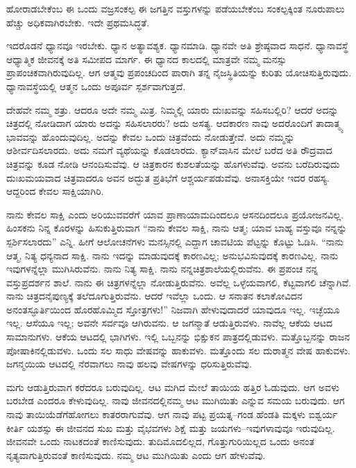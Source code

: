 \vskip 0.1cm

ಹೋರಾಡಬೇಕೆಂಬ ಈ ಒಂದು ವಜ್ರಸಂಕಲ್ಪ ಈ ಜಗತ್ತಿನ ವಸ್ತುಗಳನ್ನು ಪಡೆಯಬೇಕೆಂಬ ಸಂಕಲ್ಪಕ್ಕಿಂತ ನೂರುಪಾಲು ಹೆಚ್ಚು ಅಧಿಕವಾಗಿರಬೇಕು. ಇದೇ ಪ್ರಥಮ\break ಸಿದ್ಧತೆ.

\vskip 0.1cm

ಇದರೊಡನೆ ಧ್ಯಾನವೂ ಇರಬೇಕು. ಧ್ಯಾನ ಅತ್ಯಾವಶ್ಯಕ. ಧ್ಯಾನಮಾಡಿ. ಧ್ಯಾನವೇ ಅತಿ ಶ್ರೇಷ್ಠವಾದ ಸಾಧನೆ. ಧ್ಯಾನಾವಸ್ಥೆ ಆಧ್ಯಾತ್ಮಿಕ ಜೀವನಕ್ಕೆ ಅತಿ ಸಮೀಪದ ಮಾರ್ಗ. ಈ ಧ್ಯಾನದ ಕಾಲದಲ್ಲಿ ಮಾತ್ರವೇ ನಮ್ಮ ಮನಸ್ಸು ಪ್ರಾಪಂಚಿಕವಾಗಿರುವುದಿಲ್ಲ. ಆಗ ಆತ್ಮವು ಪ್ರಪಂಚದಿಂದ ಪಾರಾಗಿ ತನ್ನ ನೈಜಸ್ಥಿತಿಯನ್ನು ಕುರಿತು ಯೋಚಿಸುತ್ತಿರುವುದು. ಧ್ಯಾನಾವಸ್ಥೆಯಲ್ಲಿ ಆತ್ಮನ ಒಂದು ಅಪೂರ್ವ ಸ್ಪರ್ಶವಾಗುತ್ತದೆ.

\eject

ದೇಹವೇ ನಮ್ಮ ಶತ್ರು. ಆದರೂ ಅದೇ ನಮ್ಮ ಮಿತ್ರ. ನಿಮ್ಮಲ್ಲಿ ಯಾರು ದುಃಖವನ್ನು ಸಹಿಸಬಲ್ಲಿರಿ? ಆದರೆ ಅದನ್ನು ಚಿತ್ರದಲ್ಲಿ ನೋಡಿದಾಗ ಯಾರು ಅದನ್ನು ಸಹಿಸಲಾರರು? ಅದು ಅಸತ್ಯ. ಆದಕಾರಣ ನಾವು ಅದರೊಂದಿಗೆ ತಾದಾತ್ಮ್ಯ ಭಾವವನ್ನು ಹೊಂದುವುದಿಲ್ಲ. ಅದನ್ನು ಕೇವಲ ಒಂದು ಚಿತ್ರವೆಂದು ನೋಡುತ್ತೇವೆ. ಅದು ನಮ್ಮನ್ನು ಆಶೀರ್ವದಿಸಲಾರದು. ಅದು ನಮಗೆ ವ್ಯಥೆಯನ್ನು ಕೊಡಲಾರದು. ಕ್ಯಾನ್​ವಾಸಿನ ಮೇಲೆ ಬರೆದ ಅತಿ ರೌದ್ರವಾದ ಚಿತ್ರವನ್ನು ಕೂಡ ನೋಡಿ ಆನಂದಿಸುವೆವು. ಆ ಚಿತ್ರಕಾರನ ಕುಶಲತೆಯನ್ನು ಹೊಗಳುವೆವು. ಅವನು ಬರೆದಿರುವುದು ದುಃಖಮಯವಾದ ಚಿತ್ರವಾದರೂ ಅವನ ಅದ್ಭುತ ಪ್ರತಿಭೆಗೆ ಆಶ್ಚರ್ಯಪಡುವೆವು. ಅನಾಸಕ್ತಿಯೇ ಇದರ ರಹಸ್ಯ. ಆದ್ದರಿಂದ ಕೇವಲ ಸಾಕ್ಷಿಯಾಗಿರಿ.

\vskip 0.1cm

ನಾನು ಕೇವಲ ಸಾಕ್ಷಿ ಎಂದು ಅರಿಯುವವರೆಗೆ ಯಾವ ಪ್ರಾಣಾಯಾಮದಿಂದಲೂ ಆಸನದಿಂದಲೂ ಪ್ರಯೋಜನವಿಲ್ಲ. ಹಿಂಸಕನು ನಿನ್ನ ಕೊರಳನ್ನು ಹಿಸುಕುತ್ತಿರುವಾಗ “ನಾನು ಕೇವಲ ಸಾಕ್ಷಿ, ನಾನು ಆತ್ಮ; ಯಾವ ಬಾಹ್ಯ ವಸ್ತುವೂ ನನ್ನನ್ನು ಸ್ಪರ್ಶಿಸಲಾರದು” ಎನ್ನಿ. ಹೀಗೆ ಆಲೋಚನೆಗಳು ಮನಸ್ಸಿನಲ್ಲಿ ಎದ್ದಾಗ ಚಾವಟಿಯ ಪೆಟ್ಟನ್ನು ಕೊಟ್ಟು ಓಡಿಸಿ. “ನಾನು ಆತ್ಮ, ನಿತ್ಯ ಧನ್ಯನಾದ ಸಾಕ್ಷಿ. ನಾನು ಇದನ್ನು ಮಾಡುವುದಕ್ಕೆ ಕಾರಣವಿಲ್ಲ; ಅನುಭವಿಸುವು\break ದಕ್ಕೆ ಕಾರಣವಿಲ್ಲ. ನಾನು ಇವುಗಳನ್ನೆಲ್ಲಾ ಮುಗಿಸಿರುವೆನು. ನಾನು ನಿತ್ಯ ಸಾಕ್ಷಿ. ನಾನು ನನ್ನ\break ಚಿತ್ರಶಾಲೆಯಲ್ಲಿರುವೆನು. ಈ ಪ್ರಪಂಚ ನನ್ನ ವಸ್ತುಪ್ರದರ್ಶನ ಶಾಲೆ. ನಾನು ಈ ಚಿತ್ರಗಳ\break ನ್ನೆಲ್ಲಾ ನೋಡುತ್ತಿರುವೆನು. ಅವೆಲ್ಲ ಒಳ್ಳೆಯವಾಗಲಿ, ಕೆಟ್ಟವಾಗಲಿ ಚೆನ್ನಾಗಿವೆ. ನಾನು ಚಿತ್ರದ\break ನೈಪುಣ್ಯಕ್ಕೆ ತಲೆದೂಗುತ್ತಿರುವೆನು. ಆದರೆ ಇವೆಲ್ಲಾ ಒಂದು. ಆ ಸನಾತನ ಕಲಾಕೋವಿದನ ಅನಂತಸ್ಫೂರ್ತಿಯಿಂದ ಹೊರಹೊಮ್ಮಿದ ಸ್ತೋತ್ರಗಳು!” ನಿಜವಾಗಿ ಹೇಳುವುದಾದರೆ ಯಾವುದೂ ಇಲ್ಲ. ಇಚ್ಛೆಯೂ ಇಲ್ಲ. ಆಸೆಯೂ ಇಲ್ಲ; ಅವನೇ ಸರ್ವವೂ ಆಗಿರುವನು. ಆ ಜಗನ್ಮಾತೆ ಆಡುತ್ತಿರುವಳು. ನಾವೆಲ್ಲ ಆಕೆಯ ಆಟದ ಸಾಮಾನುಗಳು. ಆಕೆಯ ಆಟದಲ್ಲಿ ಭಾಗಿಗಳು. ಇಲ್ಲಿ ಒಬ್ಬನನ್ನು ಭಿಕ್ಷುಕನ ಪಾತ್ರದಲ್ಲಿಡುವಳು. ಮತ್ತೊಬ್ಬನನ್ನು ರಾಜನ ಪೋಷಾಕಿನಲ್ಲಿಡುವಳು. ಒಂದು ಸಲ ಸಾಧು ವೇಷವನ್ನು ಹಾಕುವಳು. ಮತ್ತೊಂದು ಸಲ ದುರಾತ್ಮನ ವೇಷ ಹಾಕುವಳು. ಜಗನ್ಮಯಿಯ ಆಟದಲ್ಲಿ ನೆರವಾಗಲು ನಾವು ಹಲವು ವೇಷಗಳನ್ನು ಧರಿಸುತ್ತಿರುವೆವು.

\vskip 0.1cm

ಮಗು ಆಡುತ್ತಿರುವಾಗ ಕರೆದರೂ ಬರುವುದಿಲ್ಲ. ಆಟ ಮಗಿದ ಮೇಲೆ ತಾಯಿಯ ಹತ್ತಿರ ಓಡುವುದು. ಆಗ ಅವಳು ಬರಬೇಡ ಎಂದರೂ ಕೇಳುವುದಿಲ್ಲ. ನಾವು ಜೀವನದಲ್ಲಿ\break ನಮ್ಮ ಆಟ ಮುಗಿಯಿತು ಎನ್ನುವ ಸಮಯ ಬರುವುದು. ಆಗ ನಾವು ತಾಯಿಯೆಡೆಗೆ\break ಹೋಗಲು ಕಾತರರಾಗುವೆವು. ಆಗ ನಾವು ಪಟ್ಟ ಪ್ರಯತ್ನ–ಗಂಡ ಹೆಂಡತಿ ಮಕ್ಕಳು ಐಶ್ವರ್ಯ ಕೀರ್ತಿ ಯಶಸ್ಸು ಈ ಜೀವನದ ಸುಖ ಮತ್ತು ವೈಭವಗಳು ಶಿಕ್ಷೆ ಮತ್ತು ಜಯ\break ಗಳು–ಇವುಗಳಾವುವೂ ಇರುವುದಿಲ್ಲ. ಜೀವನವೇ ಒಂದು ನಾಟಕದಂತೆ ಕಾಣಿಸುವುದು. ತುದಿಮೊದಲಿಲ್ಲದ, ಗೊತ್ತುಗುರಿಯಿಲ್ಲದ ಒಂದು ಅನಂತ ನೃತ್ಯವಾಗುತ್ತಿರುವಂತೆ ಕಾಣಿಸುವುದು. ನಮ್ಮ ಆಟ ಮುಗಿಯಿತು ಎಂದು ಆಗ ಹೇಳುವೆವು.

